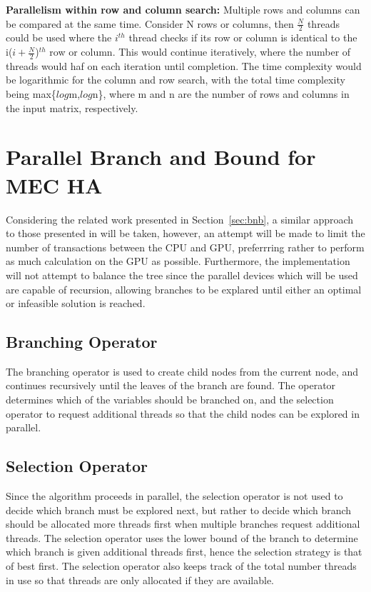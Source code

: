 \documentclass[10pt,twocolumn]{article}
\begin{document}
\textbf{Parallelism within row and column search:}
Multiple rows and columns can be compared at the same time. Consider N rows or columns, then $\frac{N}{2}$
threads could be used where the $i^{th}$ thread checks if its row or column is identical to the i($i +
\frac{N}{2}$)$^{th}$ row or column. This would continue iteratively, where the number of threads would haf on
each iteration until completion. The time complexity would be logarithmic for the column and row search, with
the total time complexity being max\{$log$m,$log$n\}, where m and n are the number of rows and columns in the
input matrix, respectively.

\section{ Parallel Branch and Bound for MEC HA } \label{sec:parbnb}

Considering the related work presented in Section~\ref{sec:bnb}, a similar approach to those presented in
\cite{melab:2012, chakroun:2012, chakroun:2013} will be taken, however, an attempt will be made to limit the
number of transactions between the CPU and GPU, preferrring rather to perform as much calculation on the GPU
as possible. Furthermore, the implementation will not attempt to balance the tree since the parallel devices
which will be used are capable of recursion, allowing branches to be explared until either an optimal or
infeasible solution is reached.

\subsection{Branching Operator}

The branching operator is used to create child nodes from the current node, and continues recursively until
the leaves of the branch are found. The operator determines which of the variables should be branched 
on, and the selection operator to request additional threads so that the child nodes can be explored in
parallel.

\subsection{Selection Operator}

Since the algorithm proceeds in parallel, the selection operator is not used to decide which branch must be
explored next, but rather to decide which branch should be allocated more threads first when multiple branches
request additional threads. The selection operator uses the lower bound of the branch to determine which
branch is given additional threads first, hence the selection strategy is that of best first. The selection
operator also keeps track of the total number threads in use so that threads are only allocated if they are
available.
\end{document}
